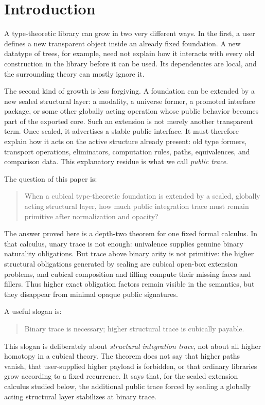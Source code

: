 \section{Introduction}

A type-theoretic library can grow in two very different ways.  In the first,
a user defines a new transparent object inside an already fixed foundation.  A
new datatype of trees, for example, need not explain how it interacts with every
old construction in the library before it can be used.  Its dependencies are
local, and the surrounding theory can mostly ignore it.

The second kind of growth is less forgiving.  A foundation can be extended by a
new sealed structural layer: a modality, a universe former, a promoted interface
package, or some other globally acting operation whose public behavior becomes
part of the exported core.  Such an extension is not merely another transparent
term.  Once sealed, it advertises a stable public interface.  It must therefore
explain how it acts on the active structure already present: old type formers,
transport operations, eliminators, computation rules, paths, equivalences, and
comparison data.  This explanatory residue is what we call \emph{public trace}.

The question of this paper is:
\begin{quote}
When a cubical type-theoretic foundation is extended by a sealed, globally acting
structural layer, how much public integration trace must remain primitive after
normalization and opacity?
\end{quote}

The answer proved here is a depth-two theorem for one fixed formal calculus.  In
that calculus, unary trace is not enough: univalence supplies genuine binary
naturality obligations.  But trace above binary arity is not primitive: the
higher structural obligations generated by sealing are cubical open-box extension
problems, and cubical composition and filling compute their missing faces and
fillers.  Thus higher exact obligation factors remain visible in the semantics,
but they disappear from minimal opaque public signatures.

A useful slogan is:
\begin{quote}
Binary trace is necessary; higher structural trace is cubically payable.
\end{quote}

This slogan is deliberately about \emph{structural integration trace}, not about
all higher homotopy in a cubical theory.  The theorem does not say that higher
paths vanish, that user-supplied higher payload is forbidden, or that ordinary
libraries grow according to a fixed recurrence.  It says that, for the sealed
extension calculus studied below, the additional public trace forced by sealing a
globally acting structural layer stabilizes at binary trace.

